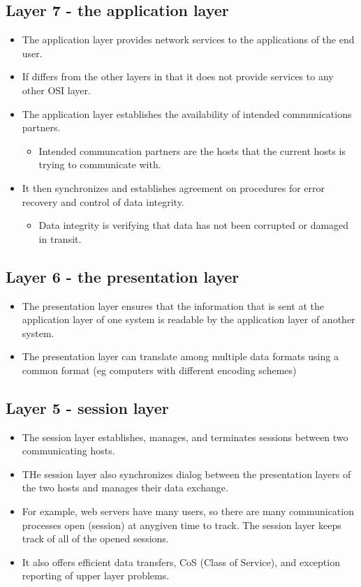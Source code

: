 \subsection{Layer 7 - the application layer}
\begin{itemize}
    \item The application layer provides network services to the applications of the end user.
    \item If differs from the other layers in that it does not provide services to any other OSI layer.
    \item The application layer establishes the availability of intended communications partners.
        \begin{itemize}
            \item Intended communcation partners are the hosts that the current hosts is trying to communicate with.
        \end{itemize}
    \item It then synchronizes and establishes agreement on procedures for error recovery and control of data integrity.
        \begin{itemize}
            \item Data integrity is verifying that data has not been corrupted or damaged in transit.
        \end{itemize}
\end{itemize}

\subsection{Layer 6 - the presentation layer}
\begin{itemize}
    \item The presentation layer ensures that the information that is sent at the application layer of one system is readable by the application layer of another system.
    \item The presentation layer can translate among multiple data formats using a common format (eg computers with different encoding schemes)
\end{itemize}

\subsection{Layer 5 - session layer}
\begin{itemize}
    \item The session layer establishes, manages, and terminates sessions between two communicating hosts.
    \item THe session layer also synchronizes dialog between the presentation layers of the two hosts and manages their data exchange.
    \item For example, web servers have many users, so there are many communication processes open (session) at anygiven time to track. The session layer keeps track of all of the opened sessions.
    \item It also offers efficient data transfers, CoS (Class of Service), and exception reporting of upper layer problems.
\end{itemize}


